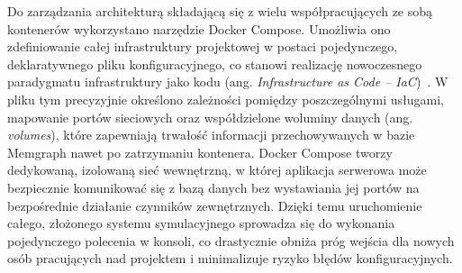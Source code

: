 \documentclass[twoside]{projektInzynierskiMS1z}
\begin{document}
Do zarządzania architekturą składającą się z wielu współpracujących ze sobą kontenerów
wykorzystano narzędzie Docker Compose. Umożliwia ono zdefiniowanie całej infrastruktury
projektowej w postaci pojedynczego, deklaratywnego pliku konfiguracyjnego, co stanowi
realizację nowoczesnego paradygmatu infrastruktury jako kodu (ang. \emph{Infrastructure
as Code -- IaC})~\cite{infrastructureascode}. W pliku tym precyzyjnie określono
zależności pomiędzy poszczególnymi usługami, mapowanie portów sieciowych oraz
współdzielone woluminy danych (ang. \emph{volumes}), które zapewniają trwałość
informacji przechowywanych w bazie Memgraph nawet po zatrzymaniu kontenera. Docker
Compose tworzy dedykowaną, izolowaną sieć wewnętrzną, w której aplikacja serwerowa może
bezpiecznie komunikować się z bazą danych bez wystawiania jej portów na bezpośrednie
działanie czynników zewnętrznych. Dzięki temu uruchomienie całego, złożonego systemu
symulacyjnego sprowadza się do wykonania pojedynczego polecenia w konsoli, co
drastycznie obniża próg wejścia dla nowych osób pracujących nad projektem
i minimalizuje ryzyko błędów konfiguracyjnych.
\end{document}
